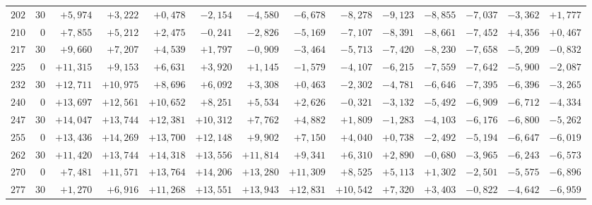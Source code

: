 \begin{landscape}
\begin{longtable}{@{}rr|r|r|r|r|r|r|r|r|r|r|r|r@{}}
\(202\) & \(30\) & \(+5{,}974\) & \(+3{,}222\) & \(+0{,}478\) & \(-2{,}154\) & \(-4{,}580\) & \(-6{,}678\) & \(-8{,}278\) & \(-9{,}123\) & \(-8{,}855\) & \(-7{,}037\) & \(-3{,}362\) & \(+1{,}777\)\\[2pt]
\(210\) & \(0\) & \(+7{,}855\) & \(+5{,}212\) & \(+2{,}475\) & \(-0{,}241\) & \(-2{,}826\) & \(-5{,}169\) & \(-7{,}107\) & \(-8{,}391\) & \(-8{,}661\) & \(-7{,}452\) & \(+4{,}356\) & \(+0{,}467\)\\
\(217\) & \(30\) & \(+9{,}660\) & \(+7{,}207\) & \(+4{,}539\) & \(+1{,}797\) & \(-0{,}909\) & \(-3{,}464\) & \(-5{,}713\) & \(-7{,}420\) & \(-8{,}230\) & \(-7{,}658\) & \(-5{,}209\) & \(-0{,}832\)\\
\(225\) & \(0\) & \(+11{,}315\) & \(+9{,}153\) & \(+6{,}631\) & \(+3{,}920\) & \(+1{,}145\) & \(-1{,}579\) & \(-4{,}107\) & \(-6{,}215\) & \(-7{,}559\) & \(-7{,}642\) & \(-5{,}900\) & \(-2{,}087\)\\
\(232\) & \(30\) & \(+12{,}711\) & \(+10{,}975\) & \(+8{,}696\) & \(+6{,}092\) & \(+3{,}308\) & \(+0{,}463\) & \(-2{,}302\) & \(-4{,}781\) & \(-6{,}646\) & \(-7{,}395\) & \(-6{,}396\) & \(-3{,}265\)\\[2pt]
\(240\) & \(0\) & \(+13{,}697\) & \(+12{,}561\) & \(+10{,}652\) & \(+8{,}251\) & \(+5{,}534\) & \(+2{,}626\) & \(-0{,}321\) & \(-3{,}132\) & \(-5{,}492\) & \(-6{,}909\) & \(-6{,}712\) & \(-4{,}334\)\\
\(247\) & \(30\) & \(+14{,}047\) & \(+13{,}744\) & \(+12{,}381\) & \(+10{,}312\) & \(+7{,}762\) & \(+4{,}882\) & \(+1{,}809\) & \(-1{,}283\) & \(-4{,}103\) & \(-6{,}176\) & \(-6{,}800\) & \(-5{,}262\)\\
\(255\) & \(0\) & \(+13{,}436\) & \(+14{,}269\) & \(+13{,}700\) & \(+12{,}148\) & \(+9{,}902\) & \(+7{,}150\) & \(+4{,}040\) & \(+0{,}738\) & \(-2{,}492\) & \(-5{,}194\) & \(-6{,}647\) & \(-6{,}019\)\\
\(262\) & \(30\) & \(+11{,}420\) & \(+13{,}744\) & \(+14{,}318\) & \(+13{,}556\) & \(+11{,}814\) & \(+9{,}341\) & \(+6{,}310\) & \(+2{,}890\) & \(-0{,}680\) & \(-3{,}965\) & \(-6{,}243\) & \(-6{,}573\)\\[2pt]
\(270\) & \(0\) & \(+7{,}481\) & \(+11{,}571\) & \(+13{,}764\) & \(+14{,}206\) & \(+13{,}280\) & \(+11{,}309\) & \(+8{,}525\) & \(+5{,}113\) & \(+1{,}302\) & \(-2{,}501\) & \(-5{,}575\) & \(-6{,}896\)\\
\(277\) & \(30\) & \(+1{,}270\) & \(+6{,}916\) & \(+11{,}268\) & \(+13{,}551\) & \(+13{,}943\) & \(+12{,}831\) & \(+10{,}542\) & \(+7{,}320\) & \(+3{,}403\) & \(-0{,}822\) & \(-4{,}642\) & \(-6{,}959\)\\

\end{longtable}
\end{landscape}
